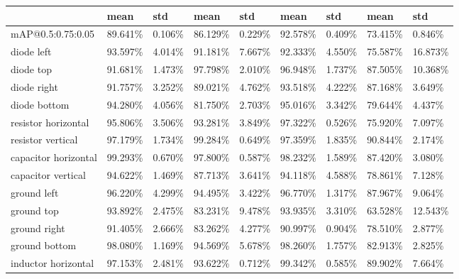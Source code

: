 \begin{table}[H]
\begin{center}
\begin{tabular}{|l|l|l|l|l|l|l|l|l|}
\hline
                                & mean     & std      & mean     & std      & mean     & std       & mean     & std      \\
\hline
mAP@0.5:0.75:0.05               & 89.641\% & 0.106\%  & 86.129\% & 0.229\%  &  \cellcolor{green}92.578\%  & 0.409\% & 73.415\% & 0.846\%  \\
\hline
\rowcolor{lightgray!50}
diode left                      & 93.597\% & 4.014\%  & 91.181\% & 7.667\%  &  92.333\%  & 4.550\% & 75.587\% & 16.873\% \\
diode top                       & 91.681\% & 1.473\%  & 97.798\% & 2.010\%  &  96.948\%  & 1.737\% & 87.505\% & 10.368\% \\
\rowcolor{lightgray!50}
diode right                     & 91.757\% & 3.252\%  & 89.021\% & 4.762\%  &  93.518\%  & 4.222\% & 87.168\% & 3.649\%  \\
diode bottom                    & 94.280\% & 4.056\%  & 81.750\% & 2.703\%  &  95.016\%  & 3.342\% & 79.644\% & 4.437\%  \\
\rowcolor{lightgray!50}
resistor horizontal             & 95.806\% & 3.506\%  & 93.281\% & 3.849\%  &  97.322\%  & 0.526\% & 75.920\% & 7.097\%  \\
resistor vertical               & 97.179\% & 1.734\%  & 99.284\% & 0.649\%  &  97.359\%  & 1.835\% & 90.844\% & 2.174\%  \\
\rowcolor{lightgray!50}
capacitor horizontal            & 99.293\% & 0.670\%  & 97.800\% & 0.587\%  &  98.232\%  & 1.589\% & 87.420\% & 3.080\%  \\
capacitor vertical              & 94.622\% & 1.469\%  & 87.713\% & 3.641\%  &  94.118\%  & 4.588\% & 78.861\% & 7.128\%  \\
\rowcolor{lightgray!50}
ground left                     & 96.220\% & 4.299\%  & 94.495\% & 3.422\%  &  96.770\%  & 1.317\% & 87.967\% & 9.064\%  \\
ground top                      & 93.892\% & 2.475\%  & 83.231\% & 9.478\%  &  93.935\%  & 3.310\% & 63.528\% & 12.543\% \\
\rowcolor{lightgray!50}
ground right                    & 91.405\% & 2.666\%  & 83.262\% & 4.277\%  &  90.997\%  & 0.904\% & 78.510\% & 2.877\%  \\
ground bottom                   & 98.080\% & 1.169\%  & 94.569\% & 5.678\%  &  98.260\%  & 1.757\% & 82.913\% & 2.825\%  \\
\rowcolor{lightgray!50}
inductor horizontal             & 97.153\% & 2.481\%  & 93.622\% & 0.712\%  &  99.342\%  & 0.585\% & 89.902\% & 7.664\%  \\

\end{tabular}
\end{center}
\end{table}
